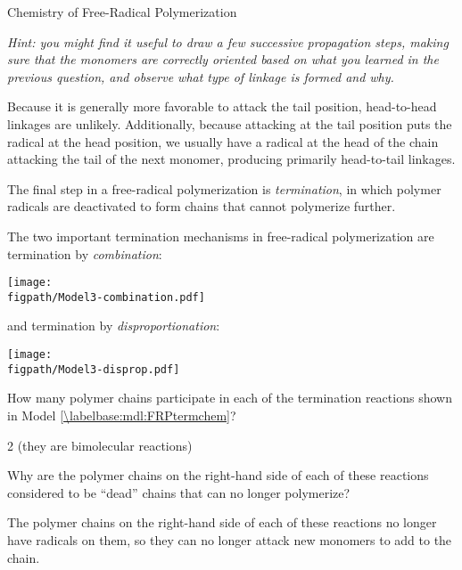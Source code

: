 \begin{activity}{Chemistry of Free-Radical Polymerization}
\begin{ctqs}
				\emph{Hint: you might find it useful to draw a few successive propagation steps, making sure that the monomers are correctly oriented based on what you learned in the previous question, and observe what type of linkage is formed and why.}
				
				\begin{solution}[2.75in]
					Because it is generally more favorable to attack the tail position, head-to-head linkages are unlikely.  Additionally, because attacking at the tail position puts the radical at the head position, we usually have a radical at the head of the chain attacking the tail of the next monomer, producing primarily head-to-tail linkages.
								
				\end{solution}
		
\end{ctqs}	

\begin{model}[Termination]
\label{\labelbase:mdl:FRPtermchem}

	The final step in a free-radical polymerization is \emph{termination}, in which polymer radicals are deactivated to form chains that cannot polymerize further.
	
	The two important termination mechanisms in free-radical polymerization are termination by \emph{combination}:
	
			\centerline{\texttt{[image: \\figpath/Model3-combination.pdf]}}
	
	and termination by \emph{disproportionation}:
	
			\centerline{\texttt{[image: \\figpath/Model3-disprop.pdf]}}

\end{model}

\begin{ctqs}

	\question How many polymer chains participate in each of the termination reactions shown in Model \ref{\labelbase:mdl:FRPtermchem}?
	
		\begin{solution}[0.5in]
			2 (they are bimolecular reactions)
		\end{solution}

	\question Why are the polymer chains on the right-hand side of each of these reactions considered to be ``dead'' chains that can no longer polymerize?
	
		\begin{solution}[1.25in]
			The polymer chains on the right-hand side of each of these reactions no longer have radicals on them, so they can no longer attack new monomers to add to the chain.
		\end{solution}
	

\end{ctqs}
\end{activity}
